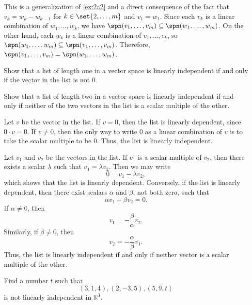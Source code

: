 \begin{sol}
    This is a generalization of \autoref{ex:2a2} and a direct consequence of the fact that $v_k = w_k - w_{k-1}$ for $k \in \set{2, \ldots, m}$ and $v_1 = w_1$. Since each $v_k$ is a linear combination of $w_1, \ldots, w_k$, we have $\spn(v_1, \ldots, v_m) \subseteq \spn(w_1, \ldots, w_m)$. On the other hand, each $w_k$ is a linear combination of $v_1, \ldots, v_k$, so $\spn(w_1, \ldots, w_m) \subseteq \spn(v_1, \ldots, v_m)$. Therefore, $\spn(v_1, \ldots, v_m) = \spn(w_1, \ldots, w_m)$.
\end{sol}
 
\begin{exercise}[2a4]
    \begin{subexercises}
        \item Show that a list of length one in a vector space is linearly independent if and only if the vector in the list is not 0.
        \item Show that a list of length two in a vector space is linearly independent if and only if neither of the two vectors in the list is a scalar multiple of the other.
    \end{subexercises}
\end{exercise}

\begin{sole}
    \item Let $v$ be the vector in the list. If $v = 0$, then the list is linearly dependent, since $0 \cdot v = 0$. If $v \neq 0$, then the only way to write $0$ as a linear combination of $v$ is to take the scalar multiple to be $0$. Thus, the list is linearly independent.
    \item Let $v_1$ and $v_2$ be the vectors in the list. If $v_1$ is a scalar multiple of $v_2$, then there exists a scalar $\lambda$ such that $v_1 = \lambda v_2$. Then we may write
    \[0 = v_1 - \lambda v_2,\]
    which shows that the list is linearly dependent. Conversely, if the list is linearly dependent, then there exist scalars $\alpha$ and $\beta$, not both zero, such that
    \[\alpha v_1 + \beta v_2 = 0.\]
    If $\alpha \neq 0$, then
    \[v_1 = -\frac{\beta}{\alpha} v_2.\]
    Similarly, if $\beta \neq 0$, then
    \[v_2 = -\frac{\alpha}{\beta} v_1.\]
    Thus, the list is linearly independent if and only if neither vector is a scalar multiple of the other.
\end{sole}
 
\begin{exercise}[2a5]
    Find a number $t$ such that
    \[(3, 1, 4), (2, -3, 5), (5, 9, t)\]
    is not linearly independent in $\mathbb{R}^3$.
\end{exercise}

